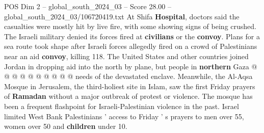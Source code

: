 \begin{textsample}{POS Dim 2 – global\_south\_2024\_03 – Score 28.00 – global\_south\_2024\_03/106720419.txt}
At Shifa \textbf{Hospital}, doctors said the casualties were mostly hit by live fire, with some showing signs of being crushed.
The Israeli military denied its forces fired at \textbf{civilians} or the \textbf{convoy}.
Plans for a sea route took shape after Israeli forces allegedly fired on a crowd of Palestinians near an aid \textbf{convoy}, killing 118.
The United States and other countries joined Jordan in dropping aid into the north by plane, but people in \textbf{northern} Gaza @ @ @ @ @ @ @ @ @ @ needs of the devastated enclave.
Meanwhile, the Al-Aqsa Mosque in Jerusalem, the third-holiest site in Islam, saw the first Friday prayers of \textbf{Ramadan} without a major outbreak of protest or violence.
The mosque has been a frequent flashpoint for Israeli-Palestinian violence in the past.
Israel limited West Bank Palestinians ' access to Friday ' s prayers to men over 55, women over 50 and \textbf{children} under 10.

\end{textsample}
